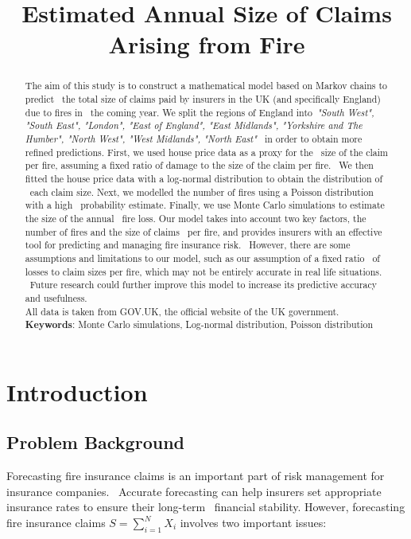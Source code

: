 \documentclass[12pt]{article}  %
\title{Estimated Annual Size of Claims Arising from Fire}  %
\begin{document}
\begin{abstract}
    The aim of this study is to construct a mathematical model based on Markov chains to predict \
    the total size of claims paid by insurers in the UK (and specifically England) due to fires in \
    the coming year. We split the regions of England into\ 
    \emph{"South West", "South East", "London", "East of England", "East Midlands", "Yorkshire and The Humber", "North West", "West Midlands", "North East"} \ 
    in order to obtain more refined predictions. First, we used house price data as a proxy for the \
    size of the claim per fire, assuming a fixed ratio of damage to the size of the claim per fire. \
    We then fitted the house price data with a log-normal distribution to obtain the distribution of \
    each claim size. Next, we modelled the number of fires using a Poisson distribution with a high \
    probability estimate. Finally, we use Monte Carlo simulations to estimate the size of the annual \
    fire loss. Our model takes into account two key factors, the number of fires and the size of claims \
    per fire, and provides insurers with an effective tool for predicting and managing fire insurance risk. \
    However, there are some assumptions and limitations to our model, such as our assumption of a fixed ratio \
    of losses to claim sizes per fire, which may not be entirely accurate in real life situations. \
    Future research could further improve this model to increase its predictive accuracy and usefulness. \\
    All data is taken from GOV.UK, the official website of the UK government.\\

    \vspace{5pt}
    \textbf{Keywords}: Monte Carlo simulations, Log-normal distribution, Poisson distribution

\end{abstract}

\maketitle  %
\tableofcontents  %


\section{Introduction}
\subsection{Problem Background}
Forecasting fire insurance claims is an important part of risk management for insurance companies. \
Accurate forecasting can help insurers set appropriate insurance rates to ensure their long-term \ 
financial stability. However, forecasting fire insurance claims $S=\sum^{N}_{i=1}X_i$ involves two important issues: \ 
\end{document}
